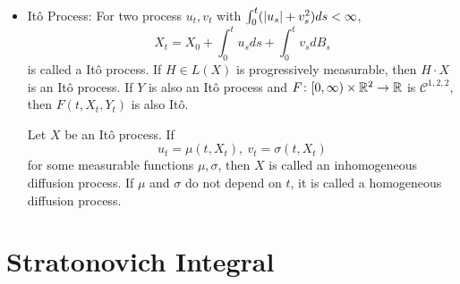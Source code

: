 \documentclass[a4paper,12pt]{article}
\begin{document}
\begin{itemize}
  \item It\^o Process: For two process $u_t,v_t$ with $\int_0^{t} (\left\lvert u_s\right\lvert + v_s^2)ds < \infty$,
  \begin{equation*}
    X_t = X_0 + \int_0^tu_sds + \int_0^tv_sdB_s
  \end{equation*}
  is called a It\^o process. If $H \in L(X)$ is progressively measurable, then $H\cdot X$ is an It\^o process. If $Y$ is also an It\^o process and $F \colon [0,\infty)\times \mathbb{R}^2 \rightarrow \mathbb{R}$ is $\mathcal{C}^{1,2,2}$, then $F(t,X_t,Y_t)$ is also It\^o.

  \noindent Let $X$ be an It\^o process. If
  \begin{equation*}
    u_t = \mu(t, X_t),~v_t= \sigma(t, X_t)
  \end{equation*}
  for some measurable functions $\mu,\sigma$, then $X$ is called an inhomogeneous diffusion process. If $\mu$ and $\sigma$ do not depend on $t$, it is called a homogeneous diffusion process.
\end{itemize}

\section{Stratonovich Integral}
\end{document}
